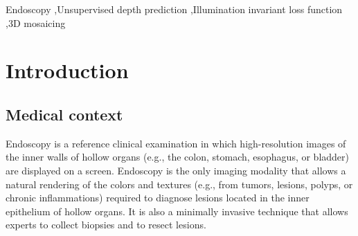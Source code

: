 \documentclass[a4paper,fleqn]{cas-dc}
\begin{document}
\begin{abstract}
\end{abstract}

\begin{keywords}
Endoscopy \sep Unsupervised depth prediction \sep Illumination invariant loss function \sep 3D mosaicing
\end{keywords}

%
\section{Introduction \label{sec:introduction}}
%
\subsection{Medical context \label{sec:medicalContext}}
Endoscopy is a reference clinical examination in which high-resolution images of the inner walls of hollow organs (e.g., the colon, stomach, esophagus, or bladder) are displayed on a screen. Endoscopy is the only imaging modality that allows a natural rendering of the colors and textures (e.g., from tumors, lesions, polyps, or chronic inflammations) required to diagnose lesions  located in the inner epithelium of hollow organs. It is also a minimally invasive technique that allows experts to collect biopsies and to resect lesions.  
\end{document}
